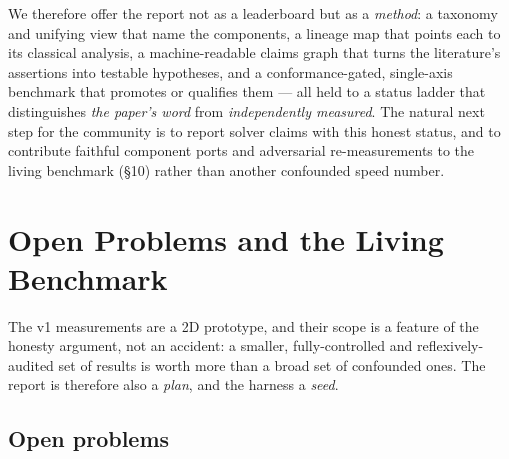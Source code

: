 \documentclass{egpubl}
\begin{document}
We therefore offer the report not as a leaderboard but as a \emph{method}: a taxonomy and unifying view that
name the components, a lineage map that points each to its classical analysis, a machine-readable
claims graph that turns the literature's assertions into testable hypotheses, and a conformance-gated,
single-axis benchmark that promotes or qualifies them --- all held to a status ladder that distinguishes
\emph{the paper's word} from \emph{independently measured}. The natural next step for the community is to report
solver claims with this honest status, and to contribute faithful component ports and adversarial
re-measurements to the living benchmark (\S10) rather than another confounded speed number.


\section{Open Problems and the Living Benchmark}

The v1 measurements are a 2D prototype, and their scope is a feature of the honesty argument, not an
accident: a smaller, fully-controlled and reflexively-audited set of results is worth more than a
broad set of confounded ones. The report is therefore also a \emph{plan}, and the harness a \emph{seed}.

\subsection{Open problems}
\end{document}
